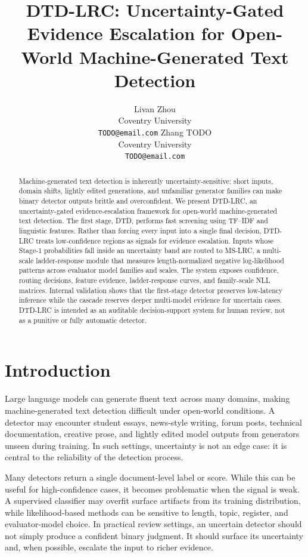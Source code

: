 \documentclass[11pt]{article}
\title{DTD-LRC: Uncertainty-Gated Evidence Escalation for Open-World Machine-Generated Text Detection}
\author{
Livan Zhou \\
Coventry University \\
\texttt{TODO@email.com}
\And
Zhang TODO \\
Coventry University \\
\texttt{TODO@email.com}
}
\begin{document}
\maketitle

\begin{abstract}
Machine-generated text detection is inherently uncertainty-sensitive: short inputs, domain shifts, lightly edited generations, and unfamiliar generator families can make binary detector outputs brittle and overconfident. We present DTD-LRC, an uncertainty-gated evidence-escalation framework for open-world machine-generated text detection. The first stage, DTD, performs fast screening using TF--IDF and linguistic features. Rather than forcing every input into a single final decision, DTD-LRC treats low-confidence regions as signals for evidence escalation. Inputs whose Stage-1 probabilities fall inside an uncertainty band are routed to MS-LRC, a multi-scale ladder-response module that measures length-normalized negative log-likelihood patterns across evaluator model families and scales. The system exposes confidence, routing decisions, feature evidence, ladder-response curves, and family-scale NLL matrices. Internal validation shows that the first-stage detector preserves low-latency inference while the cascade reserves deeper multi-model evidence for uncertain cases. DTD-LRC is intended as an auditable decision-support system for human review, not as a punitive or fully automatic detector.
\end{abstract}

\section{Introduction}

Large language models can generate fluent text across many domains, making machine-generated text detection difficult under open-world conditions. A detector may encounter student essays, news-style writing, forum posts, technical documentation, creative prose, and lightly edited model outputs from generators unseen during training. In such settings, uncertainty is not an edge case: it is central to the reliability of the detection process.

Many detectors return a single document-level label or score. While this can be useful for high-confidence cases, it becomes problematic when the signal is weak. A supervised classifier may overfit surface artifacts from its training distribution, while likelihood-based methods can be sensitive to length, topic, register, and evaluator-model choice. In practical review settings, an uncertain detector should not simply produce a confident binary judgment. It should surface its uncertainty and, when possible, escalate the input to richer evidence.
\end{document}
